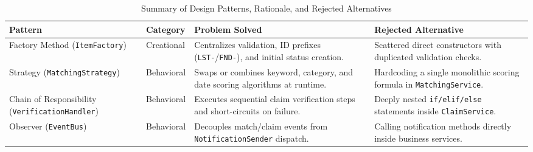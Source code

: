 \documentclass[12pt,a4paper]{article}
\begin{document}
\begin{table}[h!]
\centering
\small
\begin{tabular}{p{2.7cm}p{2.0cm}p{4.3cm}p{4.3cm}}
\toprule
\textbf{Pattern} & \textbf{Category} & \textbf{Problem Solved} & \textbf{Rejected Alternative} \\
\midrule
Factory Method (\texttt{ItemFactory}) & Creational & Centralizes validation, ID prefixes (\texttt{LST-}/\texttt{FND-}), and initial status creation. & Scattered direct constructors with duplicated validation checks. \\
Strategy (\texttt{MatchingStrategy}) & Behavioral & Swaps or combines keyword, category, and date scoring algorithms at runtime. & Hardcoding a single monolithic scoring formula in \texttt{MatchingService}. \\
Chain of Responsibility (\texttt{VerificationHandler}) & Behavioral & Executes sequential claim verification steps and short-circuits on failure. & Deeply nested \texttt{if/elif/else} statements inside \texttt{ClaimService}. \\
Observer (\texttt{EventBus}) & Behavioral & Decouples match/claim events from \texttt{NotificationSender} dispatch. & Calling notification methods directly inside business services. \\
\bottomrule
\end{tabular}
\caption{Summary of Design Patterns, Rationale, and Rejected Alternatives}
\end{table}
\end{document}
